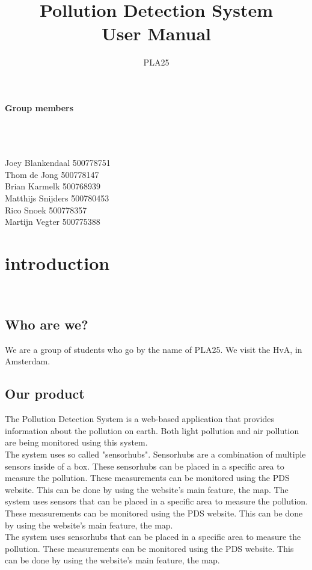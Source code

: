 \documentclass[a4paper]{article}
\title{Pollution Detection System\\User Manual}
\author{PLA25}
\begin{document}
\clearpage
\maketitle
\vspace*{\fill}
\paragraph{Group members}
~\\\\
\begin{tabbing}
Joey Blankendaal \` 500778751
\\
Thom de Jong \` 500778147
\\
Brian Karmelk \` 500768939
\\
Matthijs Snijders \` 500780453
\\
Rico Snoek \` 500778357
\\
Martijn Vegter \` 500775388
\end{tabbing}
\thispagestyle{empty}
\setcounter{page}{0}
\pagebreak
\tableofcontents
\pagebreak

\section{introduction}
~\\

\subsection{Who are we?}
We are a group of students who go by the name of PLA25. We visit the HvA, in Amsterdam.
~\\

\subsection{Our product}
The Pollution Detection System is a web-based application that provides information about the pollution on earth. Both light pollution and air pollution are being monitored using this system.
\\
The system uses so called "sensorhubs". Sensorhubs are a combination of multiple sensors inside of a box. These sensorhubs can be placed in a specific area to measure the pollution. These measurements can be monitored using the PDS website. This can be done by using the website's main feature, the map.
The system uses sensors that can be placed in a specific area to measure the pollution. These measurements can be monitored using the PDS website. This can be done by using the website's main feature, the map.
\\
The system uses sensorhubs that can be placed in a specific area to measure the pollution. These measurements can be monitored using the PDS website. This can be done by using the website's main feature, the map.
\end{document}
